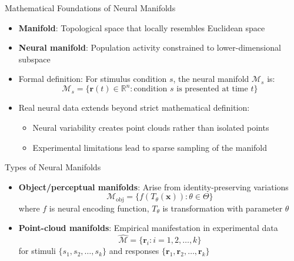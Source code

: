 \documentclass[aspectratio=169]{beamer}
\begin{document}
\begin{frame}{Mathematical Foundations of Neural Manifolds}
    \begin{itemize}
        \item \textbf{Manifold}: Topological space that locally resembles Euclidean space
        \item \textbf{Neural manifold}: Population activity constrained to lower-dimensional subspace
        \item Formal definition: For stimulus condition $s$, the neural manifold $\mathcal{M}_s$ is:
        \begin{equation}
        \mathcal{M}_s = \{\mathbf{r}(t) \in \mathbb{R}^n : \text{condition } s \text{ is presented at time } t\}
        \end{equation}
        \item Real neural data extends beyond strict mathematical definition:
        \begin{itemize}
            \item Neural variability creates point clouds rather than isolated points
            \item Experimental limitations lead to sparse sampling of the manifold
        \end{itemize}
    \end{itemize}
\end{frame}

\begin{frame}{Types of Neural Manifolds}
    \begin{itemize}
        \item \textbf{Object/perceptual manifolds}: Arise from identity-preserving variations
        \begin{equation}
        \mathcal{M}_{\text{obj}} = \{f(T_\theta(\mathbf{x})) : \theta \in \Theta\}
        \end{equation}
        where $f$ is neural encoding function, $T_\theta$ is transformation with parameter $\theta$
        
        \item \textbf{Point-cloud manifolds}: Empirical manifestation in experimental data
        \begin{equation}
        \hat{\mathcal{M}} = \{\mathbf{r}_i : i = 1, 2, \ldots, k\}
        \end{equation}
        for stimuli $\{s_1, s_2, \ldots, s_k\}$ and responses $\{\mathbf{r}_1, \mathbf{r}_2, \ldots, \mathbf{r}_k\}$
    \end{itemize}
\end{frame}
\end{document}
